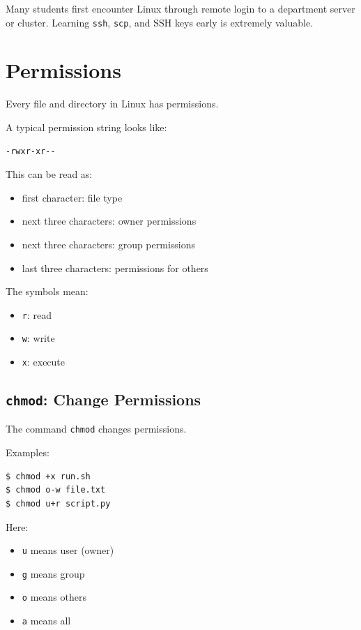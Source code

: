 \begin{protip}
Many students first encounter Linux through remote login to a department
server or cluster. Learning \texttt{ssh}, \texttt{scp}, and SSH keys
early is extremely valuable.
\end{protip}

\section{Permissions}

Every file and directory in Linux has permissions.

A typical permission string looks like:

\begin{lstlisting}
-rwxr-xr--
\end{lstlisting}

This can be read as:

\begin{itemize}
\item first character: file type
\item next three characters: owner permissions
\item next three characters: group permissions
\item last three characters: permissions for others
\end{itemize}

The symbols mean:

\begin{itemize}
\item \texttt{r}: read
\item \texttt{w}: write
\item \texttt{x}: execute
\end{itemize}

\subsection{\texttt{chmod}: Change Permissions}

The command \texttt{chmod} changes permissions.

Examples:

\begin{lstlisting}
$ chmod +x run.sh
$ chmod o-w file.txt
$ chmod u+r script.py
\end{lstlisting}

Here:

\begin{itemize}
\item \texttt{u} means user (owner)
\item \texttt{g} means group
\item \texttt{o} means others
\item \texttt{a} means all
\end{itemize}

